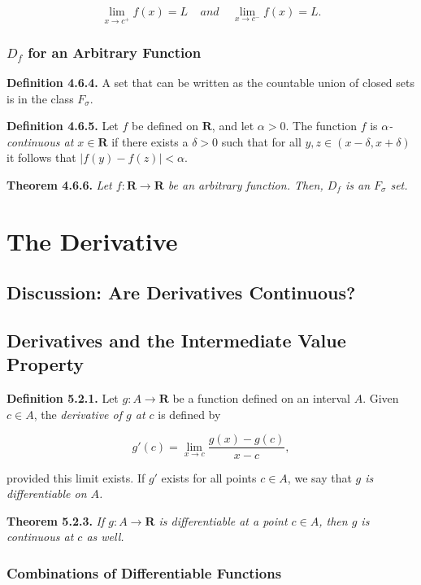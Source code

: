 \documentclass[12pt]{report}
\newcommand{\R}{\textbf{R}}
\begin{document}
\[\lim_{x\rightarrow c^+}f(x)=L\ \ \ \ \ and\ \ \ \ \ \lim_{x\rightarrow c^-}f(x)=L.\]
\bigskip

\subsection*{$D_f$ for an Arbitrary Function}

\noindent \textbf{Definition 4.6.4.} A set that can be written as the countable union of closed sets is in the class $F_\sigma$.
\bigskip

\noindent \textbf{Definition 4.6.5.} Let $f$ be defined on $\R$, and let $\alpha>0$.  The function $f$ is \textit{$\alpha$-continuous at $x\in\R$} if there exists a $\delta>0$ such that for all $y,z\in(x-\delta,x+\delta)$ it follows that $|f(y)-f(z)|<\alpha$.
\bigskip

\noindent \textbf{Theorem 4.6.6.} \textit{Let $f:\R\rightarrow\R$ be an arbitrary function.  Then, $D_f$ is an $F_\sigma$ set.}
\bigskip

\chapter{The Derivative}

\section{Discussion: Are Derivatives Continuous?}

\section{Derivatives and the Intermediate Value Property}

\noindent \textbf{Definition 5.2.1.} Let $g:A\rightarrow\R$ be a function defined on an interval $A$.  Given $c\in A$, the \textit{derivative of $g$ at $c$} is defined by

\[g'(c)=\lim_{x\rightarrow c}\frac{g(x)-g(c)}{x-c},\]

\noindent provided this limit exists.  If $g'$ exists for all points $c\in A$, we say that \textit{$g$ is differentiable on $A$.}
\bigskip

\noindent \textbf{Theorem 5.2.3.} \textit{If $g:A\rightarrow\R$ is differentiable at a point $c\in A$, then $g$ is continuous at $c$ as well.}
\bigskip

\subsection*{Combinations of Differentiable Functions}
\end{document}
